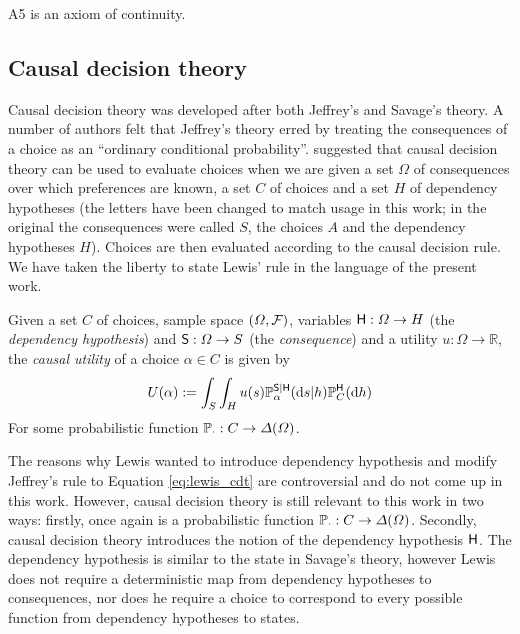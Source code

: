 A5 is an axiom of continuity.

\subsection{Causal decision theory}

Causal decision theory was developed after both Jeffrey's and Savage's theory. A number of authors \citet{lewis_causal_1981,skyrms_causal_1982} felt that Jeffrey's theory erred by treating the consequences of a choice as an ``ordinary conditional probability''. \citet{lewis_causal_1981} suggested that causal decision theory can be used to evaluate choices when we are given a set $\Omega$ of consequences over which preferences are known, a set $C$ of choices and a set $H$ of dependency hypotheses (the letters have been changed to match usage in this work; in the original the consequences were called $S$, the choices $A$ and the dependency hypotheses $H$). Choices are then evaluated according to the causal decision rule. We have taken the liberty to state Lewis' rule in the language of the present work.

\begin{definition}
Given a set $C$ of choices, sample space $(\Omega,\mathcal{F})$, variables $\mathsf{H}:\Omega\to H$ (the \emph{dependency hypothesis}) and $\mathsf{S}:\Omega\to S$ (the \emph{consequence}) and a utility $u:\Omega\to \mathbb{R}$, the \emph{causal utility} of a choice $\alpha\in C$ is given by
\begin{align}
    U(\alpha) := \int_S \int_H u(s) \mathbb{P}_\alpha^{\mathsf{S}|\mathsf{H}}(\mathrm{d}s|h) \mathbb{P}_C^{\mathsf{H}}(\mathrm{d}h)\label{eq:lewis_cdt}
\end{align}
For some probabilistic function $\mathbb{P}_\cdot:C\to \Delta(\Omega)$.
\end{definition}

The reasons why Lewis wanted to introduce dependency hypothesis and modify Jeffrey's rule to Equation \ref{eq:lewis_cdt} are controversial and do not come up in this work. However, causal decision theory is still relevant to this work in two ways: firstly, once again is a probabilistic function $\mathbb{P}_\cdot:C\to \Delta(\Omega)$. Secondly, causal decision theory introduces the notion of the dependency hypothesis $\mathsf{H}$. The dependency hypothesis is similar to the state in Savage's theory, however Lewis does not require a deterministic map from dependency hypotheses to consequences, nor does he require a choice to correspond to every possible function from dependency hypotheses to states.

